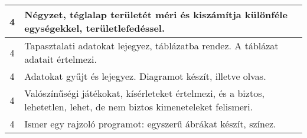 \begin{longtable}{c | p{12cm} }
                                          4 &  Négyzet, téglalap területét méri és kiszámítja különféle egységekkel, területlefedéssel. \\ \hline
                                          4 &  Tapasztalati adatokat lejegyez, táblázatba rendez. A táblázat adatait értelmezi. \\ \hline
                                          4 &  Adatokat gyűjt és lejegyez. Diagramot készít, illetve olvas. \\ \hline
                                          4 &  Valószínűségi játékokat, kísérleteket értelmezi, és a biztos, lehetetlen, lehet, de nem biztos kimeneteleket felismeri. \\ \hline
                                          4 &  Ismer egy rajzoló programot: egyszerű ábrákat készít, színez.
 \\ \hline
                                      
                        \end{longtable}
            \clearpage

